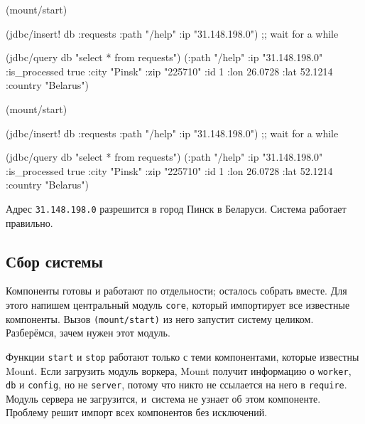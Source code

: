 \ifx\DEVICETYPE\MOBILE

\begin{english}
  \begin{clojure}
(mount/start)

(jdbc/insert! db :requests
  {:path "/help" :ip "31.148.198.0"})
;; wait for a while

(jdbc/query db "select * from requests")
({:path "/help"
  :ip "31.148.198.0"
  :is_processed true
  :city "Pinsk"
  :zip "225710" :id 1
  :lon 26.0728 :lat 52.1214
  :country "Belarus"})
  \end{clojure}
\end{english}

\else

\begin{english}
  \begin{clojure}
(mount/start)

(jdbc/insert! db :requests {:path "/help" :ip "31.148.198.0"})
;; wait for a while

(jdbc/query db "select * from requests")
({:path "/help" :ip "31.148.198.0" :is_processed true
  :city "Pinsk" :zip "225710" :id 1
  :lon 26.0728 :lat 52.1214 :country "Belarus"})
  \end{clojure}
\end{english}

\fi

Адрес \verb|31.148.198.0| разрешится в город Пинск в Беларуси. Система работает
правильно.

\subsection{Сбор системы}


Компоненты готовы и работают по отдельности; осталось собрать вместе. Для этого
напишем центральный модуль \verb|core|, который импортирует все известные
компоненты. Вызов \verb|(mount/start)| из него запустит систему
целиком. Разберёмся, зачем нужен этот модуль.

Функции \verb|start| и \verb|stop| работают только с теми компонентами, которые
известны Mount. Если загрузить модуль воркера, Mount получит информацию о
\verb|worker|, \verb|db| и \verb|config|, но не \verb|server|, потому что никто
не ссылается на него в \verb|require|. Модуль сервера не загрузится, и~система
не узнает об этом компоненте. Проблему решит импорт всех компонентов без
исключений.

\label{mount-main}

